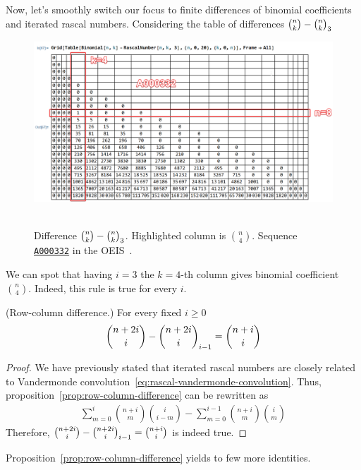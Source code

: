 Now, let's smoothly switch our focus to finite differences of binomial coefficients and iterated rascal numbers.
Considering the table of differences $\binom{n}{k}-\binom{n}{k}_{3}$
\begin{figure}[H]
    \centering
    \includegraphics[width=1\textwidth]{img/01_Difference_Binomial_Rascal_i_3_BinomialCoefficients}
    ~\caption{Difference $\binom{n}{k}-\binom{n}{k}_{3}$.
    Highlighted column is $\binom{n}{4}$.
    Sequence \href{https://oeis.org/A000332}{\texttt{A000332}} in the OEIS~\cite{sloane2009binomial}.}
    \label{fig:difference-binomial-rascal-i-3}
\end{figure}
We can spot that having $i=3$ the $k=4$-th column gives binomial coefficient $\binom{n}{4}$.
Indeed, this rule is true for every $i$.
\begin{proposition}
    \label{prop:row-column-difference}
    (Row-column difference.) For every fixed $i\geq0$
    \begin{align*}
        \binom{n+2i}{i} - \binom{n+2i}{i}_{i-1} = \binom{n+i}{i}
    \end{align*}
    \begin{proof}
        We have previously stated that iterated rascal numbers are
        closely related to Vandermonde convolution~\eqref{eq:rascal-vandermonde-convolution}.
        Thus, proposition~\eqref{prop:row-column-difference} can be rewritten as
        \begin{align*}
            \sum_{m=0}^{i} \binom{n+i}{m} \binom{i}{i-m} - \sum_{m=0}^{i-1} \binom{n+i}{m} \binom{i}{m}
        \end{align*}
        Therefore, $\binom{n+2i}{i} - \binom{n+2i}{i}_{i-1} = \binom{n+i}{i}$ is indeed true.
    \end{proof}
\end{proposition}
Proposition~\eqref{prop:row-column-difference} yields to few more identities.
